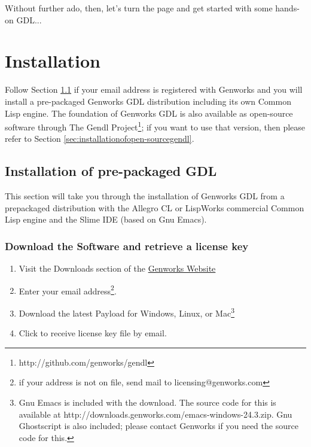 \documentclass [11pt]{book}
\begin{document}
Without further ado, then, let's turn the page and get started with some hands-on GDL...

\chapter{Installation}

\label{chap:installation}

Follow Section 
\ref{sec:installationofpre-packagedgdl} if your email address is registered with Genworks and you will
install a pre-packaged Genworks GDL distribution including its own
Common Lisp engine.  The foundation of Genworks GDL is also available
as open-source software through The Gendl Project\footnote{http://github.com/genworks/gendl}; if you want to use that version, then please refer to Section 
\ref{sec:installationofopen-sourcegendl}.

\section{Installation of pre-packaged GDL}

\label{sec:installationofpre-packagedgdl}

This section will take you through the installation of
Genworks GDL from a prepackaged distribution with the Allegro CL or
LispWorks commercial Common Lisp engine and the Slime IDE (based on
Gnu Emacs).

\subsection{Download the Software and retrieve a license key}

\label{subsec:downloadthesoftwareandretrievealicensekey}



\begin{enumerate}

\item Visit the Downloads section of the \href{http://genworks.com}{Genworks Website}

\item Enter your email address\footnote{if your address is not on file, send mail to licensing@genworks.com}.

\item Download the latest Payload for Windows, Linux, or Mac\footnote{Gnu Emacs is included with the download. The source code for this 
is available at http://downloads.genworks.com/emacs-windows-24.3.zip. Gnu Ghostscript
is also included; please contact Genworks if you need the source code for this.}

\item Click to receive license key file by email.

\end{enumerate}
\end{document}
